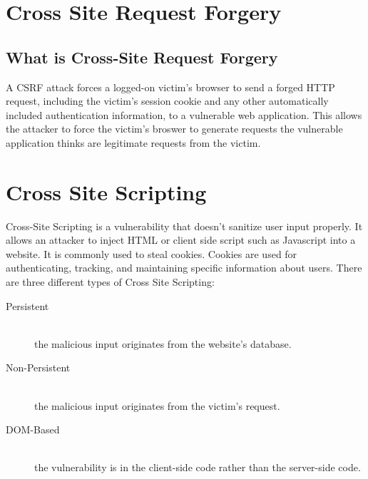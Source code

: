 \documentclass[a4paper, titlepage]{article}
\begin{document}
\section{Cross Site Request Forgery}
\subsection{What is Cross-Site Request Forgery}
A CSRF attack forces a logged-on victim's browser to send a forged HTTP request, including the victim's session cookie and any other automatically included authentication information, to a vulnerable web application. This allows the attacker to force the victim's broswer to generate requests the vulnerable application thinks are legitimate requests from the victim.

\newpage


\section{Cross Site Scripting}

Cross-Site Scripting is a vulnerability that doesn't sanitize user input properly. It allows an attacker to inject HTML or client side script such as Javascript into a website. It is commonly used to steal cookies. Cookies are used for authenticating, tracking, and maintaining specific information about users. There are three different types of Cross Site Scripting:
\begin{description}
    \item [Persistent] \hfill \\
        the malicious input originates from the website's database.
    \item [Non-Persistent]\hfill \\
        the malicious input originates from the victim's request.
    \item [DOM-Based]\hfill \\
        the vulnerability is in the client-side code rather than the server-side code.
\end{description}
\end{document}
